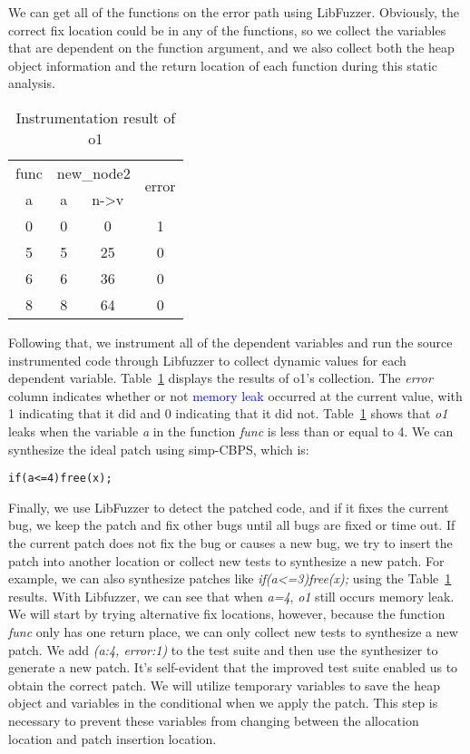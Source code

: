 \documentclass[a4j,dvipdfmx]{article}
\begin{document}
We can get all of the functions on the error path using LibFuzzer. Obviously, the correct fix location could be in any of the functions, so we collect the variables that are dependent on the function argument, and we also collect both the heap object information and the return location of each function during this static analysis. 

\begin{table}[h]
  \caption{Instrumentation result of o1}
  \label{instres}
  \centering
  \begin{tabular}{|c|c|c|c|}
    \hline
    func  & \multicolumn{2}{|c|}{new\_node2} & \multirow{2}{*}{error} \\
    \cline{1-3}
    a & a & n->v &\\
    \hline
     0 & 0  & 0 & 1\\
     5 & 5  & 25 & 0\\
     6 & 6  & 36 & 0\\
     8 & 8  & 64 & 0\\
    \hline
  \end{tabular}
\end{table}

Following that, we instrument all of the dependent variables and run the source instrumented code through Libfuzzer to collect dynamic values for each dependent variable. Table~\ref{instres} displays the results of o1's collection. The {\it error} column indicates whether or not \textcolor{blue}{memory leak} occurred at the current value, with 1 indicating that it did and 0 indicating that it did not. Table~\ref{instres} shows that {\it o1} leaks when the variable {\it a} in the function {\it func} is less than or equal to 4. We can synthesize the ideal patch using simp-CBPS, which is:

\begin{minipage}{\textwidth}
\vspace{0.2cm}
\hspace{0.3cm}
\raggedright
\verb|if(a<=4)free(x);|
\label{patch1}
\vspace{0.2cm}
\end{minipage}

Finally, we use LibFuzzer to detect the patched code, and if it fixes the current bug, we keep the patch and fix other bugs until all bugs are fixed or time out. If the current patch does not fix the bug or causes a new bug, we try to insert the patch into another location or collect new tests to synthesize a new patch. For example, we can also synthesize patches like {\it if(a<=3)free(x);} using the Table~\ref{instres} results. With Libfuzzer, we can see that when {\it a=4}, {\it o1} still occurs memory leak. We will start by trying alternative fix locations, however, because the function {\it func} only has one return place, we can only collect new tests to synthesize a new patch. We add {\it (a:4, error:1)} to the test suite and then use the synthesizer to generate a new patch. It's self-evident that the improved test suite enabled us to obtain the correct patch. We will utilize temporary variables to save the heap object and variables in the conditional when we apply the patch. This step is necessary to prevent these variables from changing between the allocation location and patch insertion location.
\end{document}
